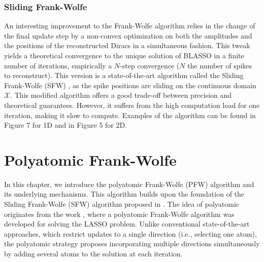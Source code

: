 \documentclass[a4paper,12pt,oneside]{report}
\theoremstyle{named}
\begin{document}
\subsection{Sliding Frank-Wolfe}

An interesting improvement to the Frank-Wolfe algorithm relies in the change of the final update step by a non-convex optimization on both the amplitudes and the positions of the reconstructed Diracs in a
simultaneous fashion. This tweak yields a theoretical convergence to the unique solution of BLASSO in a
finite number of iterations, empirically a $N$-step convergence ($N$ the number of spikes to reconstruct). This version is a state-of-the-art algorithm called the Sliding Frank-Wolfe (SFW) \cite{Denoyelle_2020}, as the spike positions are sliding on the continuous domain $\mathcal{X}$. This modified algorithm offers a good trade-off between precision and theoretical guarantees. However, it suffers from the high computation load for one iteration, making it slow to compute. Examples of the algorithm can be found in \cite{Denoyelle_2020} Figure 7 for 1D and in \cite{jimaging7120266} Figure 5 for 2D.

\chapter{Polyatomic Frank-Wolfe}
In this chapter, we introduce the polyatomic Frank-Wolfe (PFW) algorithm and its underlying mechanisms. This algorithm builds upon the foundation of the Sliding Frank-Wolfe (SFW) algorithm proposed in \cite{Denoyelle_2020}. The idea of polyatomic originates from the work \cite{Jarret_2022}, where a polyatomic Frank-Wolfe algorithm was developed for solving the LASSO problem. Unlike conventional state-of-the-art approaches, which restrict updates to a single direction (i.e., selecting one atom), the polyatomic strategy proposes incorporating multiple directions simultaneously by adding several atoms to the solution at each iteration. \\
\end{document}
